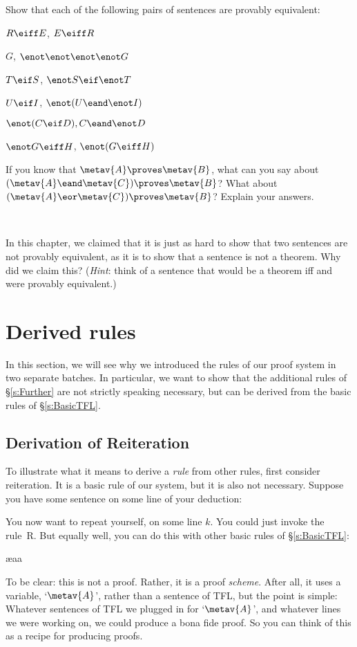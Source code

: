 \problempart
Show that each of the following pairs of sentences are provably equivalent:
\begin{earg}
\item $R \eiff E$, $E \eiff R$
\item $G$, $\enot\enot\enot\enot G$
\item $T\eif S$, $\enot S \eif \enot T$
\item $U \eif I$, $\enot(U \eand \enot I)$
\item $\enot (C \eif D), C \eand \enot D$
\item $\enot G \eiff H$, $\enot(G \eiff H)$ 
\end{earg}

\problempart
If you know that $\metav{A}\proves\metav{B}$, what can you say about $(\metav{A}\eand\metav{C})\proves\metav{B}$? What about $(\metav{A}\eor\metav{C})\proves\metav{B}$? Explain your answers.

\

\problempart In this chapter, we claimed that it is just as hard to show that two sentences are not provably equivalent, as it is to show that a sentence is not a theorem. Why did we claim this? (\emph{Hint}: think of a sentence that would be a theorem iff  and  were provably equivalent.)


\chapter{Derived rules}\label{s:Derived}
In this section, we will see why we introduced the rules of our proof system in two separate batches. In particular, we want to show that the additional rules of \S\ref{s:Further} are not strictly speaking necessary, but can be derived from the basic rules of \S\ref{s:BasicTFL}.

\section{Derivation of Reiteration}
To illustrate what it means to derive a \emph{rule} from other rules, first consider reiteration. It is a basic rule of our system, but it is also not necessary. Suppose you have some sentence on some line of your deduction:
\begin{fitchproof}
\end{fitchproof}
You now want to repeat yourself, on some line $k$. You could just invoke the rule~R. But equally well, you can do this with other basic rules of \S\ref{s:BasicTFL}:
\begin{fitchproof}
	\ae{aa}
\end{fitchproof}
To be clear: this is not a proof. Rather, it is a proof \emph{scheme}. After all, it uses a variable, `$\metav{A}$', rather than a sentence of TFL, but the point is simple: Whatever sentences of TFL we plugged in for `$\metav{A}$', and whatever lines we were working on, we could produce a bona fide proof. So you can think of this as a recipe for producing proofs.

